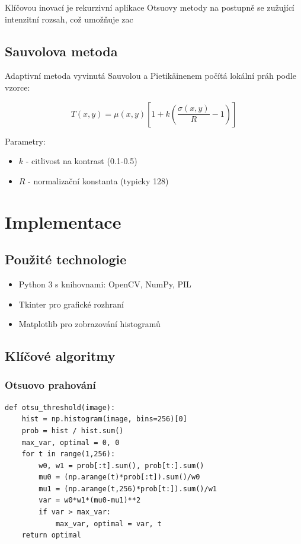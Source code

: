 \documentclass[12pt,a4paper]{article}
\begin{document}
Klíčovou inovací je rekurzivní aplikace Otsuovy metody na postupně se zužující intenzitní rozsah, což umožňuje zac

\subsection{Sauvolova metoda}
Adaptivní metoda vyvinutá Sauvolou a Pietikäinenem počítá lokální práh podle vzorce:

\begin{equation}
T(x,y) = \mu(x,y) \left[ 1 + k \left( \frac{\sigma(x,y)}{R} - 1 \right) \right]
\end{equation}

Parametry:
\begin{itemize}
\item $k$ - citlivost na kontrast (0.1-0.5)
\item $R$ - normalizační konstanta (typicky 128)
\end{itemize}

\section{Implementace}

\subsection{Použité technologie}
\begin{itemize}
\item Python 3 s knihovnami: OpenCV, NumPy, PIL
\item Tkinter pro grafické rozhraní
\item Matplotlib pro zobrazování histogramů
\end{itemize}

\subsection{Klíčové algoritmy}

\subsubsection{Otsuovo prahování}
\begin{verbatim}
def otsu_threshold(image):
    hist = np.histogram(image, bins=256)[0]
    prob = hist / hist.sum()
    max_var, optimal = 0, 0
    for t in range(1,256):
        w0, w1 = prob[:t].sum(), prob[t:].sum()
        mu0 = (np.arange(t)*prob[:t]).sum()/w0
        mu1 = (np.arange(t,256)*prob[t:]).sum()/w1
        var = w0*w1*(mu0-mu1)**2
        if var > max_var:
            max_var, optimal = var, t
    return optimal
\end{verbatim}
\end{document}
